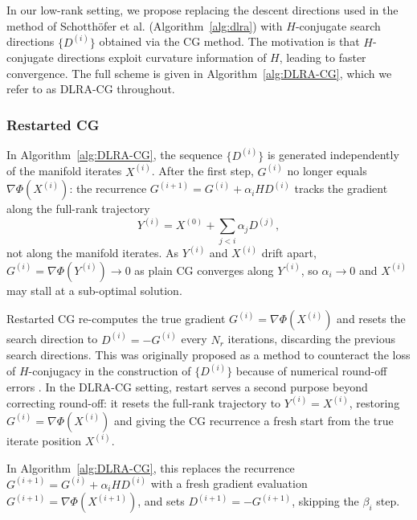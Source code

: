 In our low-rank setting, we propose replacing the descent directions used in the method of Schotthöfer et al. (Algorithm~\ref{alg:dlra}) with $H$-conjugate search directions $\{D^{(i)}\}$ obtained via the CG method. The motivation is that $H$-conjugate directions exploit curvature information of $H$, leading to faster convergence. The full scheme is given in Algorithm~\ref{alg:DLRA-CG}, which we refer to as DLRA-CG throughout.



\subsubsection{Restarted CG}\label{sec:restarted_cg}
In Algorithm~\ref{alg:DLRA-CG}, the sequence $\{D^{(i)}\}$ is generated 
independently of the manifold iterates $X^{(i)}$. After the first step, $G^{(i)}$ no longer equals $\nabla\Phi(X^{(i)})$: the recurrence $G^{(i+1)} = G^{(i)} + \alpha_i HD^{(i)}$ tracks the gradient along the full-rank trajectory
\begin{equation}\label{eq:full_rank_iterate}
    Y^{(i)} = X^{(0)} + \sum_{j<i} \alpha_j D^{(j)},
\end{equation}
not along the manifold iterates. As $Y^{(i)}$ and $X^{(i)}$ drift apart, 
$G^{(i)} = \nabla\Phi(Y^{(i)}) \to 0$ as plain CG converges along $Y^{(i)}$, so $\alpha_i \to 0$ and $X^{(i)}$ may stall at a sub-optimal solution.

Restarted CG \cite{powellRestartProceduresConjugate1977} re-computes the true gradient $G^{(i)} = \nabla\Phi(X^{(i)})$ and resets the search direction to $D^{(i)} = -G^{(i)}$ every $N_r$ iterations, discarding the previous search directions. This was originally proposed as a method to counteract the loss of $H$-conjugacy in the construction of $\{D^{(i)}\}$ because of numerical round-off errors \cite{hestenesMethodsConjugateGradients1952, powellRestartProceduresConjugate1977}. In the DLRA-CG setting, restart serves a second purpose beyond correcting round-off: it resets the full-rank trajectory to $Y^{(i)} = X^{(i)}$, restoring $G^{(i)} = \nabla\Phi(X^{(i)})$ and giving the CG recurrence a fresh start from the true iterate position $X^{(i)}$.

In Algorithm~\ref{alg:DLRA-CG}, this replaces the recurrence $G^{(i+1)} = G^{(i)} + \alpha_i HD^{(i)}$ with a fresh gradient evaluation $G^{(i+1)} = \nabla\Phi(X^{(i+1)})$, and sets $D^{(i+1)} = -G^{(i+1)}$, skipping the $\beta_i$ step.
%


